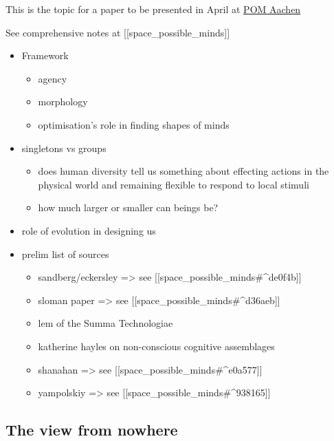 \documentclass[
]{article}
\providecommand{\tightlist}{%
  \setlength{\itemsep}{0pt}\setlength{\parskip}{0pt}}
\begin{document}
This is the topic for a paper to be presented in April at
\href{https://www.pomconference.org/pom-aachen-2024/}{POM Aachen}

See comprehensive notes at {[}{[}space\_possible\_minds{]}{]}

\begin{itemize}
\tightlist
\item
  Framework

  \begin{itemize}
  \tightlist
  \item
    agency
  \item
    morphology
  \item
    optimisation's role in finding shapes of minds
  \end{itemize}
\item
  singletons vs groups

  \begin{itemize}
  \tightlist
  \item
    does human diversity tell us something about effecting actions in
    the physical world and remaining flexible to respond to local
    stimuli
  \item
    how much larger or smaller can beings be?
  \end{itemize}
\item
  role of evolution in designing us
\item
  prelim list of sources

  \begin{itemize}
  \tightlist
  \item
    sandberg/eckersley =\textgreater{} see
    {[}{[}space\_possible\_minds\#\^{}de0f4b{]}{]}
  \item
    sloman paper =\textgreater{} see
    {[}{[}space\_possible\_minds\#\^{}d36aeb{]}{]}
  \item
    lem of the Summa Technologiae
  \item
    katherine hayles on non-conscious cognitive assemblages
  \item
    shanahan =\textgreater{} see
    {[}{[}space\_possible\_minds\#\^{}e0a577{]}{]}
  \item
    yampolskiy =\textgreater{} see
    {[}{[}space\_possible\_minds\#\^{}938165{]}{]}
  \end{itemize}
\end{itemize}

\subsection{The view from nowhere}\label{the-view-from-nowhere}
\end{document}
